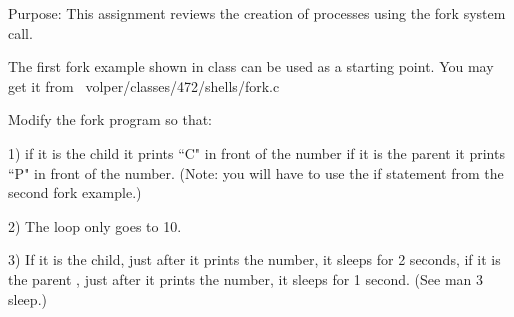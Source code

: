 

\parindent 0pt

Purpose: This assignment reviews the creation of processes using
the fork system call.

The first fork example shown in class can be used as a starting
point. You may get it from {\ltt{}~volper/classes/472/shells/fork.c}

Modify the fork program so that:

1) if it is the child it prints ``C" in front of the number
if it is the parent it prints ``P" in front of the number.
(Note: you will have to use the if statement from the second fork
example.)

2) The loop only goes to 10.

3) If it is the child, just after it prints the number, it sleeps for 2 seconds,
if it is the parent , just after it prints the number, it sleeps for 1 second.
(See {\ltt{}man 3 sleep}.)

\bye
